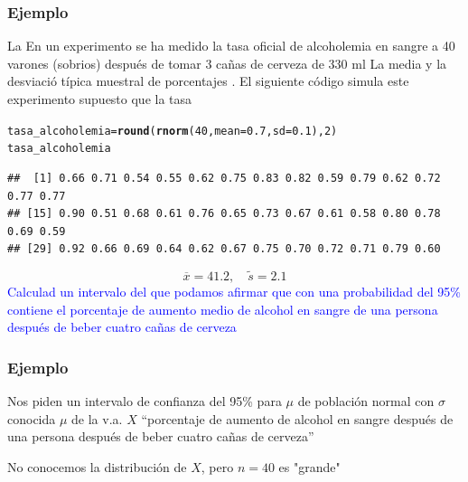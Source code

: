 \documentclass[12pt,t]{beamer}\usepackage[]{graphicx}\usepackage[]{color}
\makeatletter
\newcommand{\hlnum}[1]{\textcolor[rgb]{0.686,0.059,0.569}{#1}}%
\newcommand{\hlstd}[1]{\textcolor[rgb]{0.345,0.345,0.345}{#1}}%
\newcommand{\hlkwb}[1]{\textcolor[rgb]{0.69,0.353,0.396}{#1}}%
\newcommand{\hlkwc}[1]{\textcolor[rgb]{0.333,0.667,0.333}{#1}}%
\newcommand{\hlkwd}[1]{\textcolor[rgb]{0.737,0.353,0.396}{\textbf{#1}}}%
\newenvironment{kframe}{%
 \def\at@end@of@kframe{}%
 \ifinner\ifhmode%
  \def\at@end@of@kframe{\end{minipage}}%
  \begin{minipage}{\columnwidth}%
 \fi\fi%
 \def\FrameCommand##1{\hskip\@totalleftmargin \hskip-\fboxsep
 \colorbox{shadecolor}{##1}\hskip-\fboxsep
     \hskip-\linewidth \hskip-\@totalleftmargin \hskip\columnwidth}%
 \MakeFramed {\advance\hsize-\width
   \@totalleftmargin\z@ \linewidth\hsize
   \@setminipage}}%
 {\par\unskip\endMakeFramed%
 \at@end@of@kframe}
\newenvironment{knitrout}{}{} %
\newcommand{\blue}[1]{\textcolor{blue}{#1}}
\renewcommand{\emph}[1]{{\color{red}#1}}
\theoremstyle{plain}
\theoremstyle{definition}
\makeatother
\begin{document}
\begin{frame}[fragile]
\frametitle{Ejemplo}
\vspace*{-2ex}
La 
En un experimento se ha medido la tasa oficial  de  alcoholemia en sangre a 40 varones (sobrios) después de tomar 3 cañas de cerveza de 330 ml La media  y la desviació típica muestral de  porcentajes .
El siguiente código simula este experimento supuesto que la tasa

\begin{knitrout}
\color{fgcolor}\begin{kframe}
\begin{alltt}
\hlstd{tasa_alcoholemia}\hlkwb{=}\hlkwd{round}\hlstd{(}\hlkwd{rnorm}\hlstd{(}\hlnum{40}\hlstd{,}\hlkwc{mean}\hlstd{=}\hlnum{0.7}\hlstd{,}\hlkwc{sd}\hlstd{=}\hlnum{0.1}\hlstd{),}\hlnum{2}\hlstd{)}
\hlstd{tasa_alcoholemia}
\end{alltt}
\begin{verbatim}
##  [1] 0.66 0.71 0.54 0.55 0.62 0.75 0.83 0.82 0.59 0.79 0.62 0.72 0.77 0.77
## [15] 0.90 0.51 0.68 0.61 0.76 0.65 0.73 0.67 0.61 0.58 0.80 0.78 0.69 0.59
## [29] 0.92 0.66 0.69 0.64 0.62 0.67 0.75 0.70 0.72 0.71 0.79 0.60
\end{verbatim}
\end{kframe}
\end{knitrout}



$$
\overline{x}=41.2,\quad \widetilde{s}=2.1
$$
\blue{Calculad  un intervalo del que podamos afirmar que con una probabilidad del 95\% contiene el porcentaje de aumento medio de alcohol en sangre de una persona después de beber cuatro cañas de cerveza}
\medskip

\end{frame}

\begin{frame}
\frametitle{Ejemplo}


Nos piden un \emph{intervalo de confianza  del 95\%}  para $\mu$ de población normal con $\sigma$ conocida $\mu$ de la v.a. $X$ ``porcentaje de aumento de alcohol en sangre después de una persona después de  beber cuatro cañas de cerveza''

No conocemos la distribución de  $X$, pero $n=40$ es "grande"
\end{frame}
\end{document}
